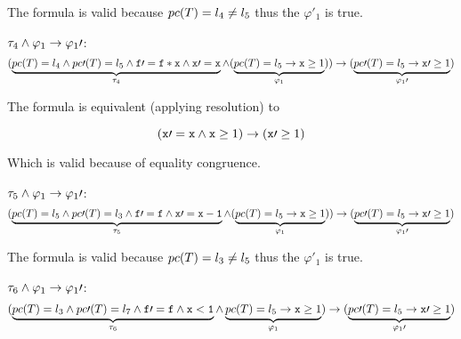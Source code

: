 		The formula is valid because $pc(T) = l_4 \neq l_5$ thus the $\varphi\prime _1$ is true.

	 \;$\tau_4 \wedge \varphi_1 \to \varphi_1\prime $: 
	\begin{equation*}
		(
			\underbrace{pc(T) = l_4 \wedge pc\prime (T) = l_5 \wedge \mathtt{f}\prime  = \mathtt{f*x} \wedge \mathtt{x\prime =x}}_{\tau_4} \wedge (\underbrace{pc(T) = l_5 \to \mathtt{x}\geq 1}_{\varphi_1})
		) 
			\to(\underbrace{pc\prime (T) = l_5 \to \mathtt{x}\prime  \geq 1}_{\varphi_1\prime })\\\\
	\end{equation*}

	The formula is equivalent (applying resolution) to

	\begin{equation*}
		(
			\mathtt{x\prime =x} \wedge  \mathtt{x}\geq 1
		) 
		\to (\mathtt{x}\prime \geq 1)
	\end{equation*}


	Which is valid because of equality congruence.

	 $\tau_5 \wedge \varphi_1 \to \varphi_1\prime $:
	\begin{equation*}
		(
			\underbrace{pc(T) = l_5 \wedge pc\prime (T) = l_3 \wedge \mathtt{f\prime =f} \wedge \mathtt{x\prime =x-1}}_{\tau_5} \wedge (\underbrace{pc(T) = l_5 \to \mathtt{x}\geq 1}_{\varphi_1})
		) 
			\to(\underbrace{pc\prime (T) = l_5 \to \mathtt{x}\prime  \geq 1}_{\varphi_1\prime })\\\\
	\end{equation*}


	The formula is valid because $pc(T) = l_3 \neq l_5$ thus the $\varphi\prime _1$ is true.

	 $\tau_6 \wedge \varphi_1 \to \varphi_1\prime $:
	\begin{equation*}
		(
			\underbrace{pc(T) = l_3 \wedge pc\prime (T) = l_7 \wedge \mathtt{f\prime =f} \wedge \mathtt{x<1}}_{\tau_6} \wedge \underbrace{pc(T) = l_5 \to \mathtt{x} \geq 1}_{\varphi_1}
		) 
			\to (\underbrace{pc\prime (T) = l_5 \to \mathtt{x}\prime  \geq 1}_{\varphi_1\prime })\\\\
	\end{equation*}


